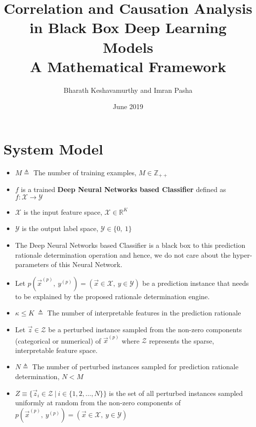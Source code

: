 \documentclass{article}
\title{%
      Correlation and Causation Analysis in Black Box Deep Learning Models \\
      \large A Mathematical Framework}
\author{Bharath Keshavamurthy and Imran Pasha}
\affil{CISCO Systems, Inc.}
\date{June 2019}
\begin{document}
\maketitle
\section{System Model}
\begin{itemize}
    \item $M \triangleq $ The number of training examples, $M \in \mathbb{Z}_{++}$
    \item $f$ is a trained \textbf{Deep Neural Networks based Classifier} defined as $f: \mathcal{X} \rightarrow \mathcal{Y}$
    \item $\mathcal{X}$ is the input feature space, $\mathcal{X} \in \mathbb{R}^{K}$
    \item $\mathcal{Y}$ is the output label space, $\mathcal{Y} \in \{0,\ 1\}$
    \item The Deep Neural Networks based Classifier is a black box to this prediction rationale determination operation and hence, we do not care about the hyper-parameters of this Neural Network.
    \item Let $p(\vec{x}^{(p)},\ y^{(p)}) = (\vec{x} \in \mathcal{X},\ y \in \mathcal{Y})$ be a prediction instance that needs to be explained by the proposed rationale determination engine. 
    \item $\kappa \leq K\ \triangleq $ The number of interpretable features in the prediction rationale
    \item Let $\vec{z} \in \mathcal{Z}$ be a perturbed instance sampled from the non-zero components (categorical or numerical) of $\vec{x}^{(p)}$ where $\mathcal{Z}$ represents the sparse, interpretable feature space.
    \item $N \triangleq $ The number of perturbed instances sampled for prediction rationale determination, $N < M$
    \item $Z \equiv \{\vec{z}_i \in \mathcal{Z}\ |\ i \in \{1, 2, \dots, N\}\}$ is the set of all perturbed instances sampled uniformly at random from the non-zero components of \\ $p(\vec{x}^{(p)},\ y^{(p)}) = (\vec{x} \in \mathcal{X},\ y \in \mathcal{Y})$
\end{itemize}
\end{document}
